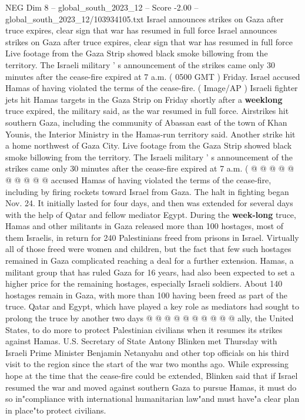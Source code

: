\begin{textsample}{NEG Dim 8 – global\_south\_2023\_12 – Score -2.00 – global\_south\_2023\_12/103934105.txt}  \label{ex:f8_neg_015}
Israel announces strikes on Gaza after truce expires, clear sign that war has resumed in full force Israel announces strikes on Gaza after truce expires, clear sign that war has resumed in full force Live footage from the Gaza Strip showed black smoke billowing from the territory.
The Israeli military ' s announcement of the strikes came only 30 minutes after the cease-fire expired at 7 a.m. ( 0500 GMT ) Friday.
Israel accused Hamas of having violated the terms of the cease-fire. ( Image/AP ) Israeli fighter jets hit Hamas targets in the Gaza Strip on Friday shortly after a \textbf{weeklong} truce expired, the military said, as the war resumed in full force.
Airstrikes hit southern Gaza, including the community of Abassan east of the town of Khan Younis, the Interior Ministry in the Hamas-run territory said.
Another strike hit a home northwest of Gaza City.
Live footage from the Gaza Strip showed black smoke billowing from the territory.
The Israeli military ' s announcement of the strikes came only 30 minutes after the cease-fire expired at 7 a.m. ( @ @ @ @ @ @ @ @ @ @ accused Hamas of having violated the terms of the cease-fire, including by firing rockets toward Israel from Gaza.
The halt in fighting began Nov. 24.
It initially lasted for four days, and then was extended for several days with the help of Qatar and fellow mediator Egypt.
During the \textbf{week-long} truce, Hamas and other militants in Gaza released more than 100 hostages, most of them Israelis, in return for 240 Palestinians freed from prisons in Israel.
Virtually all of those freed were women and children, but the fact that few such hostages remained in Gaza complicated reaching a deal for a further extension.
Hamas, a militant group that has ruled Gaza for 16 years, had also been expected to set a higher price for the remaining hostages, especially Israeli soldiers.
About 140 hostages remain in Gaza, with more than 100 having been freed as part of the truce.
Qatar and Egypt, which have played a key role as mediators had sought to prolong the truce by another two days @ @ @ @ @ @ @ @ @ @ ally, the United States, to do more to protect Palestinian civilians when it resumes its strikes against Hamas.
U.S.
Secretary of State Antony Blinken met Thursday with Israeli Prime Minister Benjamin Netanyahu and other top officials on his third visit to the region since the start of the war two months ago.
While expressing hope at the time that the cease-fire could be extended, Blinken said that if Israel resumed the war and moved against southern Gaza to pursue Hamas, it must do so in"compliance with international humanitarian law"and must have"a clear plan in place"to protect civilians.

\end{textsample}
